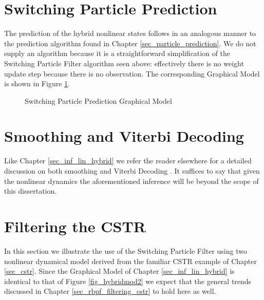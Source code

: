 \section{Switching Particle Prediction}
The prediction of the hybrid nonlinear states follows in an analogous manner to the prediction algorithm found in Chapter \ref{sec_particle_prediction}. We do not supply an algorithm because it is a straightforward simplification of the Switching Particle Filter algorithm seen above: effectively there is no weight update step because there is no observation. The corresponding Graphical Model is shown in Figure \ref{fig_hybridmod2_prediction}.
\begin{figure}[H] 
\centering
{}
\caption{Switching Particle Prediction Graphical Model}
\label{fig_hybridmod2_prediction}
\end{figure}  

\section{Smoothing and Viterbi Decoding}
Like Chapter \ref{sec_inf_lin_hybrid} we refer the reader elsewhere for a detailed discussion on both smoothing and Viterbi Decoding \cite{murphy1}. It suffices to say that given the nonlinear dynamics the aforementioned inference will be beyond the scope of this dissertation. 

\section{Filtering the CSTR}
\label{sec_spf_filtering}
In this section we illustrate the use of the Switching Particle Filter using  two nonlinear dynamical model derived from the familiar CSTR example of Chapter \ref{sec_cstr}. Since the Graphical Model of Chapter \ref{sec_inf_lin_hybrid} is identical to that of Figure \ref{fig_hybridmod2} we expect that the general trends discussed in Chapter \ref{sec_rbpf_filtering_cstr} to hold here as well.

